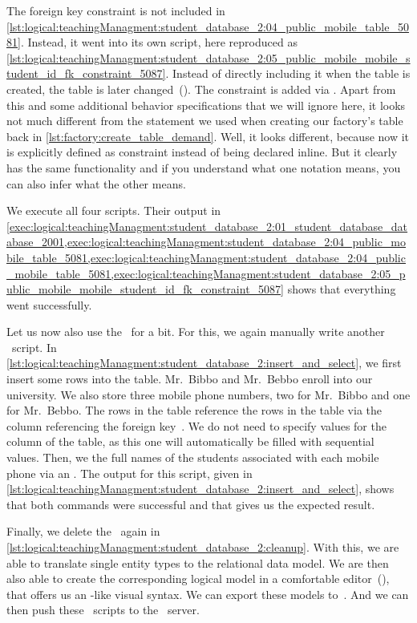 The foreign key constraint is not included in \cref{lst:logical:teachingManagment:student_database_2:04_public_mobile_table_5081}.
Instead, it went into its own script, here reproduced as \cref{lst:logical:teachingManagment:student_database_2:05_public_mobile_mobile_student_id_fk_constraint_5087}.
Instead of directly including it when the table is created, the table is later changed~().
The constraint is added via .
Apart from this and some additional behavior specifications that we will ignore here, it looks not much different from the  statement we used when creating our factory's  table back in \cref{lst:factory:create_table_demand}.
Well, it looks different, because now it is explicitly defined as constraint instead of being declared inline.
But it clearly has the same functionality and if you understand what one notation means, you can also infer what the other means.

We execute all four scripts.
Their output in \cref{exec:logical:teachingManagment:student_database_2:01_student_database_database_2001,exec:logical:teachingManagment:student_database_2:04_public_mobile_table_5081,exec:logical:teachingManagment:student_database_2:04_public_mobile_table_5081,exec:logical:teachingManagment:student_database_2:05_public_mobile_mobile_student_id_fk_constraint_5087} shows that everything went successfully.

Let us now also use the \db\ for a bit.
For this, we again manually write another \sql~script.
In \cref{lst:logical:teachingManagment:student_database_2:insert_and_select}, we first insert some rows into the  table.
Mr.~Bibbo and Mr.~Bebbo enroll into our university.
We also store three mobile phone numbers, two for Mr.~Bibbo and one for Mr.~Bebbo.
The rows in the  table reference the rows in the  table via the  column referencing the foreign key~.
We do not need to specify values for the  column of the  table, as this one will automatically be filled with sequential values.
Then, we  the full names of the students associated with each mobile phone via an .
The output for this script, given in \cref{lst:logical:teachingManagment:student_database_2:insert_and_select}, shows that both  commands were successful and that  gives us the expected result.

Finally, we delete the \db\ again in \cref{lst:logical:teachingManagment:student_database_2:cleanup}.
With this, we are able to translate single entity types to the relational data model.
We are then also able to create the corresponding logical model in a comfortable editor~(\pgmodeler), that offers us an -like visual syntax.
We can export these models to~\sql.
And we can then push these \sql~scripts to the \postgresql\ server.
\FloatBarrier%
\endhsection%
%
